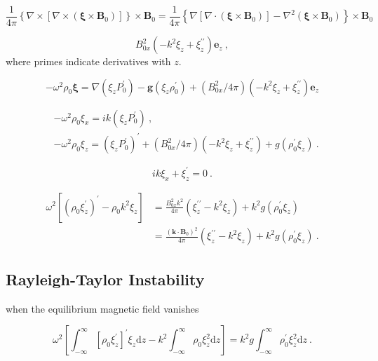 \documentclass[12pt,a4paper]{article}
\renewcommand{\vec}[1]{\boldsymbol{#1}}
\newcommand{\dif}{\mathrm{d}}
\begin{document}
\begin{equation}
\frac{1}{4\pi} \left\{\nabla \times [\nabla \times (\vec{\xi} \times \vec{B}_0)] \right\} \times \vec{B}_0 = \frac{1}{4\pi} \left\{ \nabla[\nabla \cdot (\vec{\xi} \times \vec{B}_0)] -\nabla^2 (\vec{\xi} \times \vec{B}_0) \right\} \times \vec{B}_0
\end{equation}

\begin{equation*}
B_{0x}^2 (-k^2 \xi_z +\xi_z^{\prime\prime} ) \vec{e}_z ~,
\end{equation*}
where primes indicate derivatives with $z$.

\begin{equation}
-\omega^2 \rho_0 \vec{\xi} = \nabla(\xi_z P_0^\prime) -\vec{g}(\xi_z \rho_0^\prime) +(B_{0x}^2/4\pi) (-k^2 \xi_z +\xi_z^{\prime\prime} ) \vec{e}_z 
\end{equation}

\begin{align}
& -\omega^2 \rho_0 \xi_x = ik (\xi_z P_0^\prime) ~, \\
& -\omega^2 \rho_0 \xi_z = (\xi_z P_0^\prime)^\prime +(B_{0x}^2/4\pi) (-k^2 \xi_z +\xi_z^{\prime\prime} ) +g(\rho_0^\prime \xi_z) ~.
\end{align}

\begin{equation}
ik\xi_x +\xi_z^\prime = 0 ~.
\end{equation}

\begin{align}
\nonumber \omega^2 \left[(\rho_0 \xi_z^\prime)^\prime -\rho_0 k^2 \xi_z \right] &= \frac{B_{0x}^2 k^2}{4\pi} (\xi_z^{\prime\prime} -k^2 \xi_z) +k^2 g(\rho_0^\prime \xi_z) \\
&= \frac{(\vec{k} \cdot \vec{B}_0)^2}{4\pi} (\xi_z^{\prime\prime} -k^2 \xi_z) +k^2 g(\rho_0^\prime \xi_z) ~.
\end{align}

\subsection{Rayleigh-Taylor Instability}
when the equilibrium magnetic field vanishes

\begin{equation*}
\omega^2 \left[\int_{-\infty}^\infty [\rho_0 \xi_z^\prime]^\prime  \xi_z \dif z - k^2 \int_{-\infty}^\infty \rho_0 \xi_z^2 \dif z   \right] = k^2 g \int_{-\infty}^\infty \rho_0^\prime \xi_z^2  \dif z ~.
\end{equation*}
\end{document}

